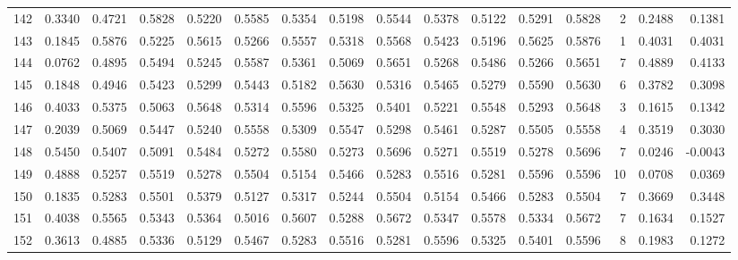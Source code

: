 \begin{tabular}{lrrrrrrrrrrrrrrr}
142 &      0.3340 &  0.4721 &  0.5828 &  0.5220 &  0.5585 &  0.5354 &  0.5198 &  0.5544 &  0.5378 &  0.5122 &   0.5291 &     0.5828 &      2 &                    0.2488 &                     0.1381 \\
143 &      0.1845 &  0.5876 &  0.5225 &  0.5615 &  0.5266 &  0.5557 &  0.5318 &  0.5568 &  0.5423 &  0.5196 &   0.5625 &     0.5876 &      1 &                    0.4031 &                     0.4031 \\
144 &      0.0762 &  0.4895 &  0.5494 &  0.5245 &  0.5587 &  0.5361 &  0.5069 &  0.5651 &  0.5268 &  0.5486 &   0.5266 &     0.5651 &      7 &                    0.4889 &                     0.4133 \\
145 &      0.1848 &  0.4946 &  0.5423 &  0.5299 &  0.5443 &  0.5182 &  0.5630 &  0.5316 &  0.5465 &  0.5279 &   0.5590 &     0.5630 &      6 &                    0.3782 &                     0.3098 \\
146 &      0.4033 &  0.5375 &  0.5063 &  0.5648 &  0.5314 &  0.5596 &  0.5325 &  0.5401 &  0.5221 &  0.5548 &   0.5293 &     0.5648 &      3 &                    0.1615 &                     0.1342 \\
147 &      0.2039 &  0.5069 &  0.5447 &  0.5240 &  0.5558 &  0.5309 &  0.5547 &  0.5298 &  0.5461 &  0.5287 &   0.5505 &     0.5558 &      4 &                    0.3519 &                     0.3030 \\
148 &      0.5450 &  0.5407 &  0.5091 &  0.5484 &  0.5272 &  0.5580 &  0.5273 &  0.5696 &  0.5271 &  0.5519 &   0.5278 &     0.5696 &      7 &                    0.0246 &                    -0.0043 \\
149 &      0.4888 &  0.5257 &  0.5519 &  0.5278 &  0.5504 &  0.5154 &  0.5466 &  0.5283 &  0.5516 &  0.5281 &   0.5596 &     0.5596 &     10 &                    0.0708 &                     0.0369 \\
150 &      0.1835 &  0.5283 &  0.5501 &  0.5379 &  0.5127 &  0.5317 &  0.5244 &  0.5504 &  0.5154 &  0.5466 &   0.5283 &     0.5504 &      7 &                    0.3669 &                     0.3448 \\
151 &      0.4038 &  0.5565 &  0.5343 &  0.5364 &  0.5016 &  0.5607 &  0.5288 &  0.5672 &  0.5347 &  0.5578 &   0.5334 &     0.5672 &      7 &                    0.1634 &                     0.1527 \\
152 &      0.3613 &  0.4885 &  0.5336 &  0.5129 &  0.5467 &  0.5283 &  0.5516 &  0.5281 &  0.5596 &  0.5325 &   0.5401 &     0.5596 &      8 &                    0.1983 &                     0.1272 \\

\end{tabular}
